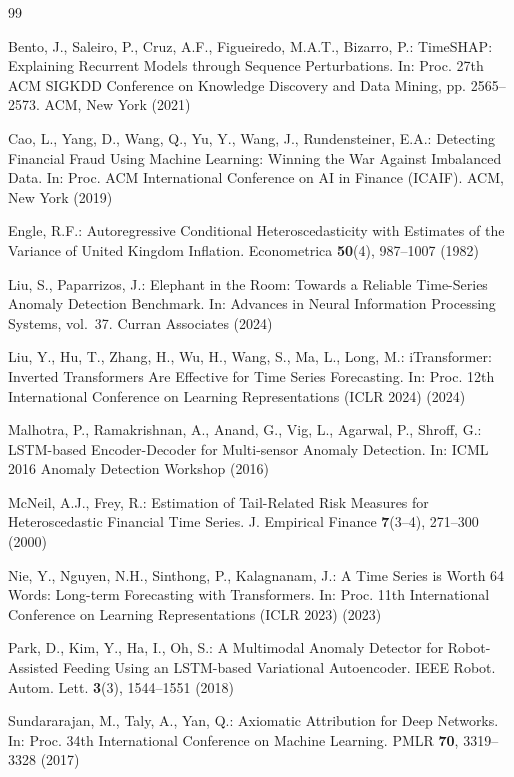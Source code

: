 \documentclass{llncs}
\begin{document}
\clearpage
\begin{thebibliography}{99}

Bento, J., Saleiro, P., Cruz, A.F., Figueiredo, M.A.T., Bizarro, P.:
TimeSHAP: Explaining Recurrent Models through Sequence Perturbations.
In: Proc. 27th ACM SIGKDD Conference on Knowledge Discovery and Data Mining, pp. 2565--2573.
ACM, New York (2021)

Cao, L., Yang, D., Wang, Q., Yu, Y., Wang, J., Rundensteiner, E.A.:
Detecting Financial Fraud Using Machine Learning: Winning the War Against Imbalanced Data.
In: Proc. ACM International Conference on AI in Finance (ICAIF).
ACM, New York (2019)

Engle, R.F.:
Autoregressive Conditional Heteroscedasticity with Estimates of the Variance of United Kingdom Inflation.
Econometrica \textbf{50}(4), 987--1007 (1982)

Liu, S., Paparrizos, J.:
Elephant in the Room: Towards a Reliable Time-Series Anomaly Detection Benchmark.
In: Advances in Neural Information Processing Systems, vol.~37.
Curran Associates (2024)

Liu, Y., Hu, T., Zhang, H., Wu, H., Wang, S., Ma, L., Long, M.:
iTransformer: Inverted Transformers Are Effective for Time Series Forecasting.
In: Proc. 12th International Conference on Learning Representations (ICLR 2024) (2024)

Malhotra, P., Ramakrishnan, A., Anand, G., Vig, L., Agarwal, P., Shroff, G.:
LSTM-based Encoder-Decoder for Multi-sensor Anomaly Detection.
In: ICML 2016 Anomaly Detection Workshop (2016)

McNeil, A.J., Frey, R.:
Estimation of Tail-Related Risk Measures for Heteroscedastic Financial Time Series.
J. Empirical Finance \textbf{7}(3--4), 271--300 (2000)

Nie, Y., Nguyen, N.H., Sinthong, P., Kalagnanam, J.:
A Time Series is Worth 64 Words: Long-term Forecasting with Transformers.
In: Proc. 11th International Conference on Learning Representations (ICLR 2023) (2023)

Park, D., Kim, Y., Ha, I., Oh, S.:
A Multimodal Anomaly Detector for Robot-Assisted Feeding Using an LSTM-based Variational Autoencoder.
IEEE Robot. Autom. Lett. \textbf{3}(3), 1544--1551 (2018)

Sundararajan, M., Taly, A., Yan, Q.:
Axiomatic Attribution for Deep Networks.
In: Proc. 34th International Conference on Machine Learning.
PMLR \textbf{70}, 3319--3328 (2017)


\end{thebibliography}
\end{document}
